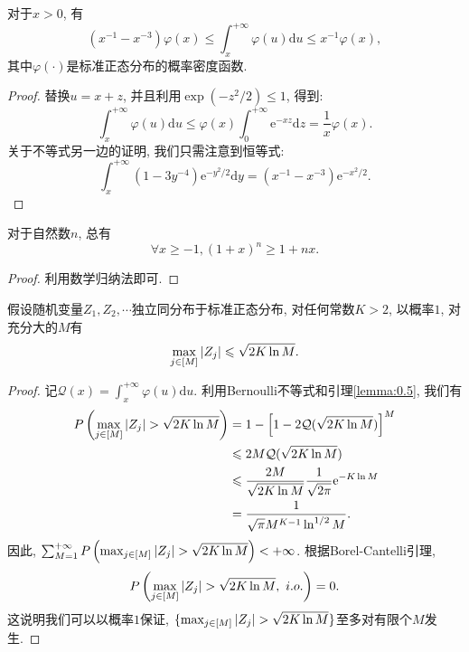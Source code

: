 \documentclass[12pt]{article}
\begin{document}
	
	\begin{Lemma}[正态分布的尾概率估计]\label{lemma:0.5}
	    对于$x>0$, 有
	    \begin{equation}
	        \left(x^{-1} - x^{-3}\right)\varphi(x) \leqslant \int_{x}^{+\infty}\varphi(u)\mathrm{d}u \leqslant x^{-1}\varphi(x),
	    \end{equation}
	    其中$\varphi(\cdot)$是标准正态分布的概率密度函数.
	\end{Lemma}
	\begin{proof}
	    替换$u = x + z$, 并且利用$\exp(-z^2/2)\leqslant 1$, 得到:
	    \begin{equation*}
	        \int_{x}^{+\infty}\varphi(u)\mathrm{d}u \leqslant \varphi(x)\int_{0}^{+\infty}\mathrm{e}^{-xz}\mathrm{d}z = \frac{1}{x}\varphi(x).
	    \end{equation*}
	    关于不等式另一边的证明, 我们只需注意到恒等式:
	    \begin{equation*}
	         \int_{x}^{+\infty}(1 - 3y^{-4})\mathrm{e}^{-y^2/2}\mathrm{d}y = (x^{-1} - x^{-3})\mathrm{e}^{-x^2/2}.
	    \end{equation*}
	\end{proof}
	
	\begin{Lemma}
	    对于自然数$n$, 总有\begin{equation}
	        \forall x\geqslant -1, (1+x)^n\geqslant 1+nx.
	    \end{equation}
	\end{Lemma}
	\begin{proof}
	    利用数学归纳法即可.
	\end{proof}
	
	\begin{Lemma}
	    假设随机变量$Z_1,Z_2,\cdots$独立同分布于标准正态分布, 对任何常数$K>2$, 以概率$1$, 对充分大的$M$有
	    \begin{equation}
	        \max_{j\in[M]} \abs{Z_j} \leqslant \sqrt{2K\ln M}.
	    \end{equation}
	\end{Lemma}
	\begin{proof}
	    记$\mathcal{Q}(x) = \int_{x}^{+\infty}\varphi(u)\mathrm{d}u$. 利用Bernoulli不等式和引理\ref{lemma:0.5}, 我们有
	    \begin{align*}
	        P\left(\max_{j\in[M]} \abs{Z_j} > \sqrt{2K\ln M} \right) &= 1 - \left[ 1-2\mathcal{Q}(\sqrt{2K\ln M}) \right]^M\\
	        &\leqslant 2M\mathcal{Q}(\sqrt{2K\ln M})\\
	        &\leqslant \frac{2M}{\sqrt{2K\ln M}}\frac{1}{\sqrt{2\pi}}\mathrm{e}^{-K\ln M}\\
	        &= \frac{1}{\sqrt{\pi}M^{K-1}\ln^{1/2} M}.
	    \end{align*}
	    因此, $\sum_{M = 1}^{+\infty}P\left(\max_{j\in[M]} \abs{Z_j} > \sqrt{2K\ln M} \right) < +\infty$. 根据Borel-Cantelli引理, 
	    \begin{equation*}
	        P\left(\max_{j\in[M]} \abs{Z_j} > \sqrt{2K\ln M},~i.o. \right) = 0.
	    \end{equation*}
	    这说明我们可以以概率$1$保证, $\{\max_{j\in[M]} \abs{Z_j} > \sqrt{2K\ln M} \}$至多对有限个$M$发生.
	\end{proof}
\end{document}
